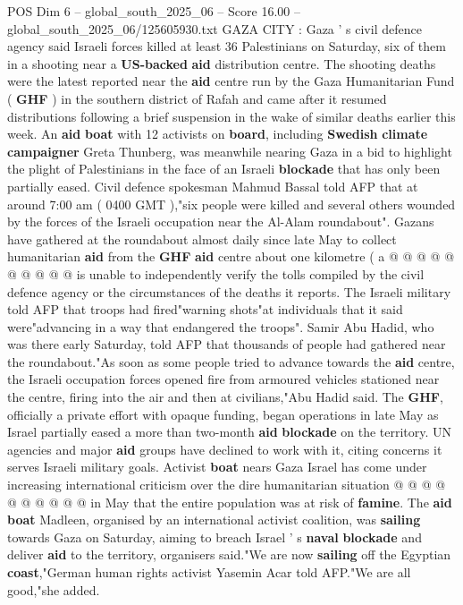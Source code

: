 \begin{textsample}{POS Dim 6 – global\_south\_2025\_06 – Score 16.00 – global\_south\_2025\_06/125605930.txt}  \label{ex:f6_pos_007}
GAZA CITY : Gaza ' s civil defence agency said Israeli forces killed at least 36 Palestinians on Saturday, six of them in a shooting near a \textbf{US-backed} \textbf{aid} distribution centre.
The shooting deaths were the latest reported near the \textbf{aid} centre run by the Gaza Humanitarian Fund ( \textbf{GHF} ) in the southern district of Rafah and came after it resumed distributions following a brief suspension in the wake of similar deaths earlier this week.
An \textbf{aid} \textbf{boat} with 12 activists on \textbf{board}, including \textbf{Swedish} \textbf{climate} \textbf{campaigner} Greta Thunberg, was meanwhile nearing Gaza in a bid to highlight the plight of Palestinians in the face of an Israeli \textbf{blockade} that has only been partially eased.
Civil defence spokesman Mahmud Bassal told AFP that at around 7:00 am ( 0400 GMT ),"six people were killed and several others wounded by the forces of the Israeli occupation near the Al-Alam roundabout".
Gazans have gathered at the roundabout almost daily since late May to collect humanitarian \textbf{aid} from the \textbf{GHF} \textbf{aid} centre about one kilometre ( a @ @ @ @ @ @ @ @ @ @ is unable to independently verify the tolls compiled by the civil defence agency or the circumstances of the deaths it reports.
The Israeli military told AFP that troops had fired"warning shots"at individuals that it said were"advancing in a way that endangered the troops".
Samir Abu Hadid, who was there early Saturday, told AFP that thousands of people had gathered near the roundabout."As soon as some people tried to advance towards the \textbf{aid} centre, the Israeli occupation forces opened fire from armoured vehicles stationed near the centre, firing into the air and then at civilians,"Abu Hadid said.
The \textbf{GHF}, officially a private effort with opaque funding, began operations in late May as Israel partially eased a more than two-month \textbf{aid} \textbf{blockade} on the territory.
UN agencies and major \textbf{aid} groups have declined to work with it, citing concerns it serves Israeli military goals.
Activist \textbf{boat} nears Gaza Israel has come under increasing international criticism over the dire humanitarian situation @ @ @ @ @ @ @ @ @ @ in May that the entire population was at risk of \textbf{famine}.
The \textbf{aid} \textbf{boat} Madleen, organised by an international activist coalition, was \textbf{sailing} towards Gaza on Saturday, aiming to breach Israel ' s \textbf{naval} \textbf{blockade} and deliver \textbf{aid} to the territory, organisers said."We are now \textbf{sailing} off the Egyptian \textbf{coast},"German human rights activist Yasemin Acar told AFP."We are all good,"she added.

\end{textsample}
